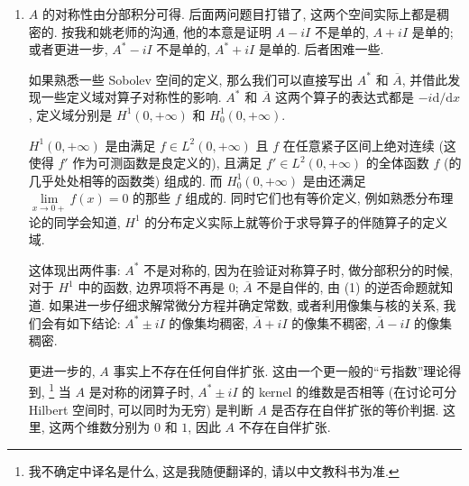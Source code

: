 \begin{enumerate}
    \item[(5)] $A$ 的对称性由分部积分可得. 后面两问题目打错了, 这两个空间实际上都是稠密的. 
    按我和姚老师的沟通, 他的本意是\textcolor{cc0000}{证明 $A-iI$ 不是单的, $A+iI$ 是单的; 或者更进一步, $A^*-iI$ 不是单的, $A^*+iI$ 是单的.} 后者困难一些.
    
    如果熟悉一些 Sobolev 空间的定义, 那么我们可以直接写出 $A^*$ 和 $\overline{A}$, 并借此发现一些定义域对算子对称性的影响. 
    $A^*$ 和 $\overline{A}$ 这两个算子的表达式都是 $-i\mathrm{d}/\mathrm{d}x$, 定义域分别是 $H^1(0,+\infty)$ 和 $H_0^1(0,+\infty)$.

    $H^1(0,+\infty)$ 是由满足 $f\in L^2(0,+\infty)$ 且 $f$ 在任意紧子区间上绝对连续 (这使得 $f'$ 作为可测函数是良定义的), 
    且满足 $f'\in L^2(0,+\infty)$ 的全体函数 $f$ (的几乎处处相等的函数类) 组成的. 
    而 $H_0^1(0,+\infty)$ 是由还满足 $\lim\limits_{x\to 0+}f(x)=0$ 的那些 $f$ 组成的. 
    同时它们也有等价定义, 例如熟悉分布理论的同学会知道, $H^1$ 的分布定义实际上就等价于求导算子的伴随算子的定义域.

    这体现出两件事: $A^*$ 不是对称的, 因为在验证对称算子时, 做分部积分的时候, 对于 $H^1$ 中的函数, 边界项将不再是 $0$; 
    $\overline{A}$ 不是自伴的, 由 (1) 的逆否命题就知道. 
    如果进一步仔细求解常微分方程并确定常数, 或者利用像集与核的关系, 
    我们会有如下结论: $A^*\pm iI$ 的像集均稠密, 
    $\overline{A}+ iI$ 的像集不稠密, $\overline{A}-iI$ 的像集稠密.

    更进一步的, $A$ 事实上不存在任何自伴扩张. 这由一个更一般的“亏指数”理论得到, 
    \footnote{我不确定中译名是什么, 这是我随便翻译的, 请以中文教科书为准.} 
    当 $A$ 是对称的闭算子时, $A^*\pm iI$ 的 kernel 的维数是否相等 
    (在讨论可分 Hilbert 空间时, 可以同时为无穷) 
    是判断 $A$ 是否存在自伴扩张的等价判据. 
    这里, 这两个维数分别为 $0$ 和 $1$, 因此 $A$ 不存在自伴扩张.
\end{enumerate}



